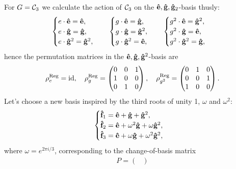 	{\allowdisplaybreaks\begin{example}
		\label{example:regCyc3}
		For $G = \mathcal{C}_3$ we calculate the action of $\mathcal{C}_3$ on the $\mathbf{\hat{e}}, \mathbf{\hat{g}}, \mathbf{\hat{g}}_2$-basis thusly:
		\begin{align*}
			\begin{cases}
				e \cdot \mathbf{\hat{e}} = \mathbf{\hat{e}}, \\
				e \cdot \mathbf{\hat{g}} = \mathbf{\hat{g}}, \\
				e \cdot \mathbf{\hat{g}}^2 = \mathbf{\hat{g}}^2,
			\end{cases} \quad \begin{cases}
				g \cdot \mathbf{\hat{e}} = \mathbf{\hat{g}}, \\
				g \cdot \mathbf{\hat{g}} = \mathbf{\hat{g}}^2, \\
				g \cdot \mathbf{\hat{g}}^2 = \mathbf{\hat{e}},
			\end{cases} \quad \begin{cases}
			g^2 \cdot \mathbf{\hat{e}} = \mathbf{\hat{g}}^2, \\
			g^2 \cdot \mathbf{\hat{g}} = \mathbf{\hat{e}}, \\
			g^2 \cdot \mathbf{\hat{g}}^2 = \mathbf{\hat{g}},
			\end{cases}
		\end{align*}
		hence the permutation matrices in the $\mathbf{\hat{e}}, \mathbf{\hat{g}}, \mathbf{\hat{g}}^2$-basis are
		\begin{align*}
			\rho_e^{\text{Reg}} = \text{id}, \quad \rho_g^{\text{Reg}} = \begin{pmatrix}
				0&0&1 \\ 1&0&0 \\ 0&1&0
			\end{pmatrix}, \quad \rho_{g^2}^{\text{Reg}} = \begin{pmatrix}
			0&1&0 \\ 0&0&1 \\ 1&0&0 
			\end{pmatrix}.
		\end{align*}
		Let's choose a new basis inspired by the third roots of unity 1, $\omega$ and $\omega^2$:
		\begin{align*}
			\begin{cases}
				\mathbf{\hat{f}}_1 = \mathbf{\hat{e}} + \mathbf{\hat{g}} + \mathbf{\hat{g}}^2, \\
				\mathbf{\hat{f}}_2 = \mathbf{\hat{e}} + \omega^2\mathbf{\hat{g}} + \omega\mathbf{\hat{g}}^2, \\
				\mathbf{\hat{f}}_3 = \mathbf{\hat{e}} + \omega\mathbf{\hat{g}} + \omega^2\mathbf{\hat{g}}^2,
			\end{cases}
		\end{align*}
		where $\omega = e^{2 \pi i/3}$, corresponding to the change-of-basis matrix 
		\begin{align*}
			P = \begin{pmatrix}

\end{pmatrix}
\end{align*}
\end{example}}
